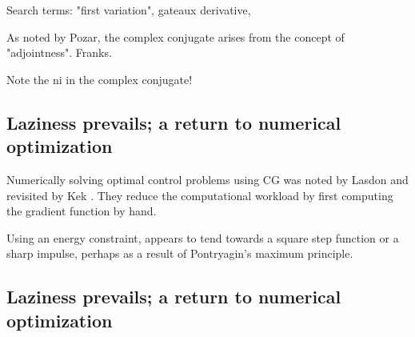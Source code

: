 \documentclass[paper.tex]{subfiles}
\begin{document}
Search terms: "first variation", gateaux derivative, 

As noted by Pozar, the complex conjugate arises from the concept of "adjointness". Franks.

Note the ni in the complex conjugate!


\subsection{Laziness prevails; a return to numerical optimization}

Numerically solving optimal control problems using CG was noted by Lasdon \cite{conjugate1967} and 
revisited by Kek \cite{Conjugate}. They reduce the computational workload by first computing the 
gradient function by hand.

Using an energy constraint, appears to tend towards a square step function or a sharp impulse, perhaps as a result of Pontryagin's maximum principle\cite{Optimum1964}.



\subsection{Laziness prevails; a return to numerical optimization}
\end{document}
